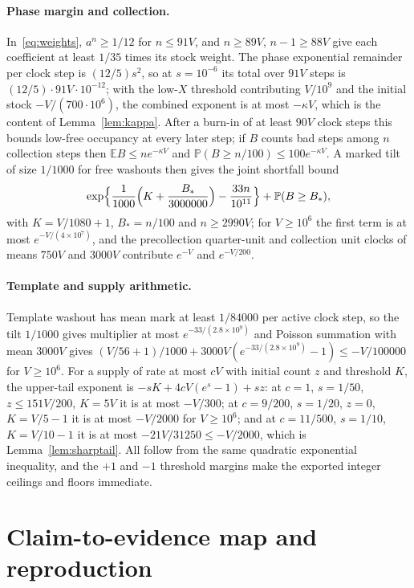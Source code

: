 \documentclass[11pt,a4paper]{article}
\theoremstyle{plain}
\theoremstyle{definition}
\theoremstyle{remark}
\newcommand{\Prob}{\mathbb P}
\newcommand{\E}{\mathbb E}
\begin{document}
\paragraph{Phase margin and collection.}
In~\eqref{eq:weights}, $a^n\ge1/12$ for $n\le91V$, and $n\ge89V$, $n-1\ge88V$ give each coefficient at least $1/35$ times its stock weight. The phase exponential remainder per clock step is $(12/5)s^2$, so at $s=10^{-6}$ its total over $91V$ steps is $(12/5)\cdot91V\cdot10^{-12}$; with the low-$X$ threshold contributing $V/10^{9}$ and the initial stock $-V/(700\cdot10^{6})$, the combined exponent is at most $-\kappa V$, which is the content of Lemma~\ref{lem:kappa}. After a burn-in of at least $90V$ clock steps this bounds low-free occupancy at every later step; if $B$ counts bad steps among $n$ collection steps then $\E B\le ne^{-\kappa V}$ and $\Prob(B\ge n/100)\le100e^{-\kappa V}$. A marked tilt of size $1/1000$ for free washouts then gives the joint shortfall bound
\[
\exp\Bigl\{\frac1{1000}\Bigl(K+\frac{B_\ast}{3000000}\Bigr)-\frac{33n}{10^{11}}\Bigr\}+\Prob(B\ge B_\ast),
\]
with $K=V/1080+1$, $B_\ast=n/100$ and $n\ge2990V$; for $V\ge10^6$ the first term is at most $e^{-V/(4\times10^7)}$, and the precollection quarter-unit and collection unit clocks of means $750V$ and $3000V$ contribute $e^{-V}$ and $e^{-V/200}$.

\paragraph{Template and supply arithmetic.}
Template washout has mean mark at least $1/84000$ per active clock step, so the tilt $1/1000$ gives multiplier at most $e^{-33/(2.8\times10^{9})}$ and Poisson summation with mean $3000V$ gives $(V/56+1)/1000+3000V(e^{-33/(2.8\times10^{9})}-1)\le-V/100000$ for $V\ge10^6$. For a supply of rate at most $cV$ with initial count $z$ and threshold $K$, the upper-tail exponent is $-sK+4cV(e^s-1)+sz$: at $c=1$, $s=1/50$, $z\le151V/200$, $K=5V$ it is at most $-V/300$; at $c=9/200$, $s=1/20$, $z=0$, $K=V/5-1$ it is at most $-V/2000$ for $V\ge10^6$; and at $c=11/500$, $s=1/10$, $K=V/10-1$ it is at most $-21V/31250\le-V/2000$, which is Lemma~\ref{lem:sharptail}. All follow from the same quadratic exponential inequality, and the $+1$ and $-1$ threshold margins make the exported integer ceilings and floors immediate.

\section{Claim-to-evidence map and reproduction}\label{app:formal}
\end{document}
